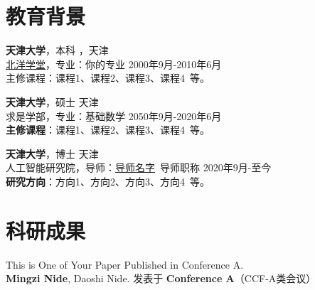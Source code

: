     \section{\makebox[\widthof{\faGraduationCap}][c]{\color{TJU_Blue}{\faGraduationCap}}\quad 教育背景}


    {\large \textbf{天津大学}}，本科 \hfill {，天津} \\
    \href{学院官网.whu.edu.cn}{\underline{北洋学堂}}，专业：你的专业 \hfill {2000年9月-2010年6月} \\
    {主修课程}：课程1、课程2、课程3、课程4\ 等。

    \vspace{0.5em}
    {\large \textbf{天津大学}}，硕士 \hfill {天津} \\
    {{求是学部}}，专业：基础数学 \hfill {2050年9月-2020年6月} \\
    \textbf{主修课程}：课程1、课程2、课程3、课程4\ 等。

    \vspace{0.5em}
    {\large \textbf{天津大学}}，博士 \hfill {天津} \\
    {{人工智能研究院}}，导师：\href{导师的个人主页.site}{导师名字}\ 导师职称 \hfill {2020年9月-至今} \\
    \textbf{研究方向}：方向1、方向2、方向3、方向4\ 等。

    \section{\makebox[\widthof{\faGraduationCap}][c]{\color{TJU_Blue}{\faGraduationCap}}\quad 科研成果}


    This is One of Your Paper Published in Conference A. \\
    \textbf{Mingzi Nide}, Daoshi Nide. \hfill 
    发表于 \textbf{Conference A}（CCF-A类会议） 

